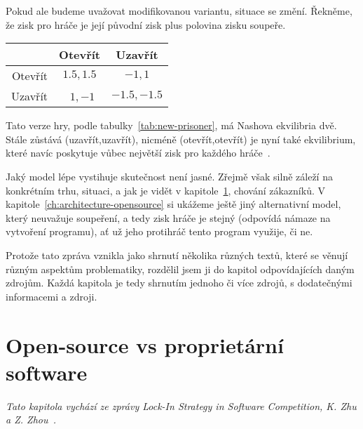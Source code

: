 \begin{multicols}{2}
Pokud ale budeme uvažovat modifikovanou variantu, situace se změní. Řekněme, že zisk pro hráče je její původní zisk plus polovina zisku soupeře.

\begin{Figure}
\begin{center}
\begin{tabular}{r| c c}
		& Otevřít & Uzavřít \\
		\hline
	Otevřít &\cellcolor{gray!20}  $1.5,1.5$ & $-1,1$ \\
	Uzavřít & $1,-1$ &\cellcolor{gray!20}  $-1.5,-1.5$ \\
\end{tabular}
\end{center}
\label{tab:new-prisoner}
\end{Figure}

Tato verze hry, podle tabulky~\ref{tab:new-prisoner}, má Nashova ekvilibria dvě. Stále zůstává (uzavřít,uzavřít), nicméně (otevřít,otevřít) je nyní také ekvilibrium, které navíc poskytuje vůbec největší zisk pro každého hráče~\cite{network-effects-opensource}.

Jaký model lépe vystihuje skutečnost není jasné. Zřejmě však silně záleží na konkrétním trhu, situaci, a jak je vidět v kapitole~\ref{ch:opensource-vs-proprietary}, chování zákazníků. V kapitole~\ref{ch:architecture-opensource} si ukážeme ještě jiný alternativní model, který neuvažuje soupeření, a tedy zisk hráče je stejný (odpovídá námaze na vytvoření programu), ať už jeho protihráč tento program využije, či ne.

Protože tato zpráva vznikla jako shrnutí několika různých textů, které se věnují různým aspektům problematiky, rozdělil jsem ji do kapitol odpovídajících daným zdrojům. Každá kapitola je tedy shrnutím jednoho či více zdrojů, s dodatečnými informacemi a zdroji.




\section{Open-source vs proprietární software}
\label{ch:opensource-vs-proprietary}
	{\em Tato kapitola vychází ze zprávy Lock-In Strategy in Software Competition, K. Zhu a Z. Zhou~\cite{lock-in-competition}.}


\end{multicols}
